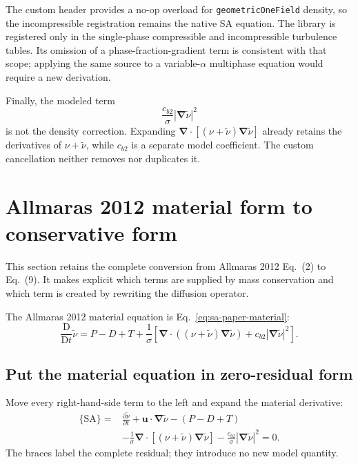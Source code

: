 \documentclass[11pt]{article}
\newcommand{\SADt}{\frac{\mathrm D}{\mathrm Dt}}
\newcommand{\SAgrad}{\boldsymbol{\nabla}}
\newcommand{\SAdiv}{\boldsymbol{\nabla}\!\cdot}
\newcommand{\SAcode}[1]{\texttt{#1}}
\begin{document}
The custom header provides a no-op overload for
\SAcode{geometricOneField} density, so the incompressible registration remains
the native SA equation.  The library is registered only in the single-phase
compressible and incompressible turbulence tables.  Its omission of a
phase-fraction-gradient term is consistent with that scope; applying the same
source to a variable-\(\alpha\) multiphase equation would require a new
derivation.

Finally, the modeled term
\begin{equation}
  \frac{c_{b2}}{\sigma}
  \left|\SAgrad\widetilde{\nu}\right|^2
\end{equation}
is not the density correction.  Expanding
\(\SAdiv[(\nu+\widetilde{\nu})\SAgrad\widetilde{\nu}]\) already retains the
derivatives of \(\nu+\widetilde{\nu}\), while \(c_{b2}\) is a separate model
coefficient.  The custom cancellation neither removes nor duplicates it.

\clearpage
\section{Allmaras 2012 material form to conservative form}
\label{sec:sa-paper-derivation}

This section retains the complete conversion from Allmaras 2012 Eq.~(2) to
Eq.~(9).  It makes explicit which terms are supplied by mass conservation and
which term is created by rewriting the diffusion operator.

The Allmaras 2012 material equation is Eq.~\eqref{eq:sa-paper-material}:
\begin{equation}
  \SADt\widetilde{\nu}
  =P-D+T
  +\frac{1}{\sigma}
   \left[
     \SAdiv\!\left((\nu+\widetilde{\nu})\SAgrad\widetilde{\nu}\right)
     +c_{b2}\left|\SAgrad\widetilde{\nu}\right|^2
   \right].
  \label{eq:sa-deriv-paper-start}
\end{equation}

\subsection{Put the material equation in zero-residual form}

Move every right-hand-side term to the left and expand the material derivative:
\begin{equation}
\begin{aligned}
  \{\mathrm{S\!A}\}={}&
  \frac{\partial\widetilde{\nu}}{\partial t}
  +\boldsymbol u\mathbin{\cdot}\SAgrad\widetilde{\nu}
  -(P-D+T) \\
  &-\frac{1}{\sigma}
   \SAdiv\!\left[(\nu+\widetilde{\nu})\SAgrad\widetilde{\nu}\right]
  -\frac{c_{b2}}{\sigma}
   \left|\SAgrad\widetilde{\nu}\right|^2
  =0.
\end{aligned}
\label{eq:sa-deriv-sa-residual}
\end{equation}
The braces label the complete residual; they introduce no new model quantity.
\end{document}
